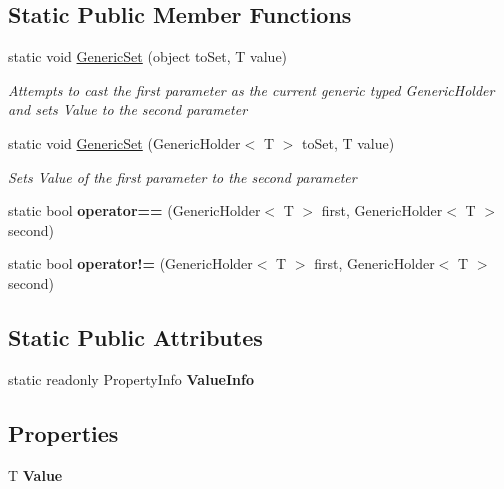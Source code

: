 \subsection*{Static Public Member Functions}
\begin{DoxyCompactItemize}
\item 
static void \hyperlink{class_cloud_api_public_1_1_model_1_1_generic_holder_3_01_t_01_4_a2ac50952da1c4e50022e088ab008320c}{Generic\-Set} (object to\-Set, T value)
\begin{DoxyCompactList}\small\item\em Attempts to cast the first parameter as the current generic typed Generic\-Holder and sets Value to the second parameter \end{DoxyCompactList}\item 
static void \hyperlink{class_cloud_api_public_1_1_model_1_1_generic_holder_3_01_t_01_4_a29cf3968ce80669be0198b82b31b39b6}{Generic\-Set} (Generic\-Holder$<$ T $>$ to\-Set, T value)
\begin{DoxyCompactList}\small\item\em Sets Value of the first parameter to the second parameter \end{DoxyCompactList}\item 
\hypertarget{class_cloud_api_public_1_1_model_1_1_generic_holder_3_01_t_01_4_a51e6981119106b071f379e0e7c1feab2}{static bool {\bfseries operator==} (Generic\-Holder$<$ T $>$ first, Generic\-Holder$<$ T $>$ second)}\label{class_cloud_api_public_1_1_model_1_1_generic_holder_3_01_t_01_4_a51e6981119106b071f379e0e7c1feab2}

\item 
\hypertarget{class_cloud_api_public_1_1_model_1_1_generic_holder_3_01_t_01_4_a2adf7bf5ae3df85fc79def019354d396}{static bool {\bfseries operator!=} (Generic\-Holder$<$ T $>$ first, Generic\-Holder$<$ T $>$ second)}\label{class_cloud_api_public_1_1_model_1_1_generic_holder_3_01_t_01_4_a2adf7bf5ae3df85fc79def019354d396}

\end{DoxyCompactItemize}
\subsection*{Static Public Attributes}
\begin{DoxyCompactItemize}
\item 
static readonly Property\-Info {\bfseries Value\-Info}
\end{DoxyCompactItemize}
\subsection*{Properties}
\begin{DoxyCompactItemize}
\item 
\hypertarget{class_cloud_api_public_1_1_model_1_1_generic_holder_3_01_t_01_4_ace7e72a0f82d9041d184b5ffbe9a197f}{T {\bfseries Value}}\label{class_cloud_api_public_1_1_model_1_1_generic_holder_3_01_t_01_4_ace7e72a0f82d9041d184b5ffbe9a197f}

\end{DoxyCompactItemize}


